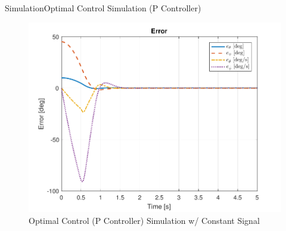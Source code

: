 \documentclass{beamer}
\begin{document}
\begin{frame}{Simulation}{Optimal Control Simulation (P Controller)}
    \begin{figure}
      \centering 
      \includegraphics[scale=0.5]{figs/MATLAB/LQR/P_Simulation/LQR_Error_Con}
      \caption{Optimal Control (P Controller) Simulation w/ Constant Signal}
      \label{fig:LQR_Error_Con}
    \end{figure}
\end{frame}
\end{document}

